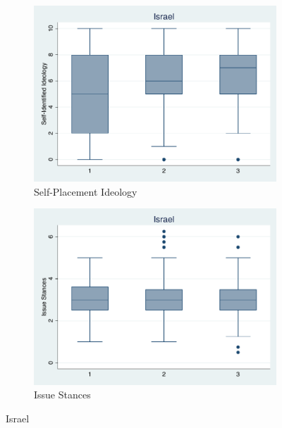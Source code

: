 \documentclass[12pt, titlepage]{article}
\begin{document}
\begin{figure}[H]
	\centering
	\begin{subfigure}[b]{0.475\textwidth}   
		\centering 
		\includegraphics[width=\textwidth]{IdeoBP/Israel}
		\caption{Self-Placement Ideology}
	\end{subfigure}
	\hfill
	\begin{subfigure}[b]{0.475\textwidth}
		\centering 
		\includegraphics[width=\textwidth]{BoxLib/Israel}
		\caption{Issue Stances}
	\end{subfigure}
	\caption{Israel}
	\label{Israel}
\end{figure}
\end{document}
